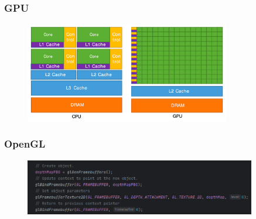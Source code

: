 \documentclass[aspectratio=169]{beamer}
\begin{document}
\begin{frame}
\frametitle{GPU}
	\begin{figure}
		\centering
		\includegraphics[width=0.8\textwidth]{gpu.png}
	\end{figure}
\end{frame}

\begin{frame}
\frametitle{OpenGL}
	\begin{figure}
		\centering
		\includegraphics[width=0.9\textwidth]{OpenGL_example.png}
	\end{figure}
\end{frame}

\end{document}
